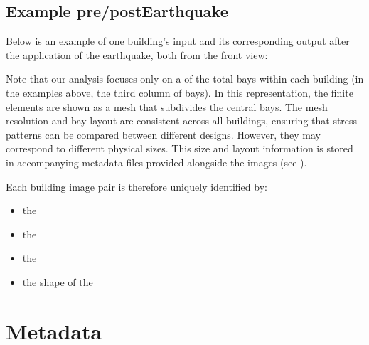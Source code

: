 \documentclass[letterpaper,10pt,english]{sphinxmanual}
\begin{document}
\subsection{Example pre\sphinxhyphen{}/post\sphinxhyphen{}Earthquake}
\label{\detokenize{data:example-pre-post-earthquake}}
\sphinxAtStartPar
Below is an example of one building’s input and its corresponding output after
the application of the earthquake, both from the front view:



\sphinxAtStartPar
Note that our analysis focuses only on a  of the total bays within each
building (in the examples above, the third column of bays).
In this representation, the finite elements are shown as a mesh that subdivides
the central bays.
The mesh resolution and bay layout are consistent across all buildings,
ensuring that stress patterns can be compared between different designs.
However, they may correspond to different physical sizes.
This size and layout information is stored in accompanying metadata files
provided alongside the images (see {\hyperref[\detokenize{data:metadata}]{}}).

\sphinxAtStartPar
Each building image pair is therefore uniquely identified by:
\begin{itemize}
\item {} 
\sphinxAtStartPar
the 

\item {} 
\sphinxAtStartPar
the 

\item {} 
\sphinxAtStartPar
the 

\item {} 
\sphinxAtStartPar
the shape of the 

\end{itemize}


\section{Metadata}
\label{\detokenize{data:metadata}}\label{\detokenize{data:id1}}
\end{document}
